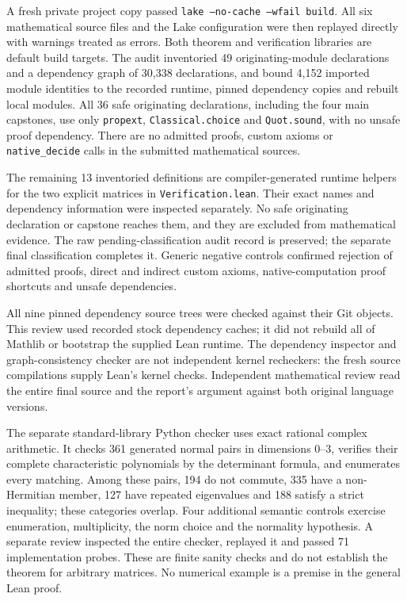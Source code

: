 \documentclass[11pt]{article}
\begin{document}
A fresh private project copy passed \texttt{lake --no-cache --wfail build}.
All six mathematical source files and the Lake configuration were then
replayed directly with warnings treated as errors. Both theorem and
verification libraries are default build targets. The audit inventoried
49 originating-module declarations and a dependency graph of 30,338
declarations, and bound 4,152 imported module identities to the recorded
runtime, pinned dependency copies and rebuilt local modules. All 36 safe originating declarations,
including the four main capstones, use only \texttt{propext},
\texttt{Classical.choice} and \texttt{Quot.sound}, with no unsafe proof
dependency. There are no admitted proofs, custom axioms or
\texttt{native\_decide} calls in the submitted mathematical sources.

The remaining 13 inventoried definitions are compiler-generated runtime
helpers for the two explicit matrices in \texttt{Verification.lean}. Their
exact names and dependency information were inspected separately. No safe
originating declaration or capstone reaches them, and they are excluded from
mathematical evidence. The raw pending-classification audit record is
preserved; the separate final classification completes it. Generic negative
controls confirmed rejection of admitted proofs, direct and indirect custom
axioms, native-computation proof shortcuts and unsafe dependencies.

All nine pinned dependency source trees were checked against their Git
objects. This review used recorded stock dependency caches; it did not rebuild
all of Mathlib or bootstrap the supplied Lean runtime. The dependency inspector
and graph-consistency checker are not independent kernel recheckers: the
fresh source compilations supply Lean's kernel checks. Independent mathematical
review read the entire final source and the report's argument against both
original language versions.

The separate standard-library Python checker uses exact rational complex
arithmetic. It checks 361 generated normal pairs in dimensions $0$--$3$,
verifies their complete characteristic polynomials by the determinant formula,
and enumerates every matching. Among these pairs, 194 do not commute, 335
have a non-Hermitian member, 127 have repeated eigenvalues and 188 satisfy a
strict inequality; these categories overlap. Four additional semantic controls
exercise enumeration, multiplicity, the norm choice and the normality
hypothesis. A separate review inspected the entire checker, replayed it and
passed 71 implementation probes. These are finite sanity checks and do not
establish the theorem for arbitrary matrices. No numerical example is a
premise in the general Lean proof.
\end{document}
